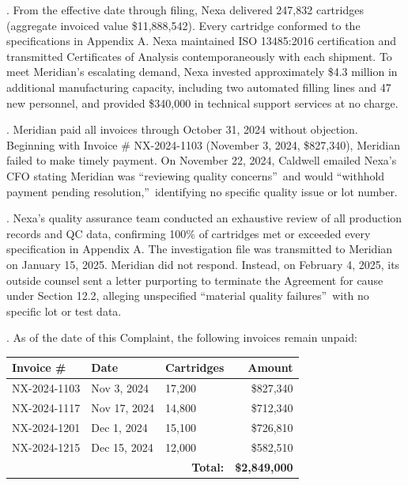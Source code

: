 \documentclass[12pt,letterpaper]{article}
\begin{document}
.\hspace{0.5em} From the effective date through filing, Nexa delivered 247,832 cartridges (aggregate invoiced value \$11,888,542). Every cartridge conformed to the specifications in Appendix A. Nexa maintained ISO 13485:2016 certification and transmitted Certificates of Analysis contemporaneously with each shipment. To meet Meridian's escalating demand, Nexa invested approximately \$4.3 million in additional manufacturing capacity, including two automated filling lines and 47 new personnel, and provided \$340,000 in technical support services at no charge.

.\hspace{0.5em} Meridian paid all invoices through October 31, 2024 without objection. Beginning with Invoice \# NX-2024-1103 (November 3, 2024, \$827,340), Meridian failed to make timely payment. On November 22, 2024, Caldwell emailed Nexa's CFO stating Meridian was \textquotedblleft reviewing quality concerns\textquotedblright\ and would \textquotedblleft withhold payment pending resolution,\textquotedblright\ identifying no specific quality issue or lot number.

.\hspace{0.5em} Nexa's quality assurance team conducted an exhaustive review of all production records and QC data, confirming 100\% of cartridges met or exceeded every specification in Appendix A. The investigation file was transmitted to Meridian on January 15, 2025. Meridian did not respond. Instead, on February 4, 2025, its outside counsel sent a letter purporting to terminate the Agreement for cause under Section 12.2, alleging unspecified \textquotedblleft material quality failures\textquotedblright\ with no specific lot or test data.

.\hspace{0.5em} As of the date of this Complaint, the following invoices remain unpaid:

\vspace{2pt}
\begin{center}
\begin{minipage}{0.88\textwidth}
\footnotesize
\begin{tabularx}{\textwidth}{l l l r}
\toprule
\textbf{Invoice \#} & \textbf{Date} & \textbf{Cartridges} & \textbf{Amount} \\
\midrule
NX-2024-1103 & Nov 3, 2024 & 17,200 & \$827,340 \\{}
NX-2024-1117 & Nov 17, 2024 & 14,800 & \$712,340 \\{}
NX-2024-1201 & Dec 1, 2024 & 15,100 & \$726,810 \\{}
NX-2024-1215 & Dec 15, 2024 & 12,000 & \$582,510 \\
\bottomrule
\multicolumn{3}{r}{\textbf{Total:}} & \textbf{\$2,849,000} \\
\end{tabularx}
\end{minipage}
\end{center}
\vspace{2pt}
\end{document}
